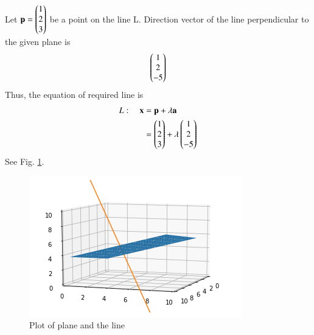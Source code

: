 
Let $\mathbf{p} = \begin{pmatrix}1\\2\\3\end{pmatrix}$ be a point on the line L.
Direction vector of the  line perpendicular to the given plane is
\begin{align}
 \begin{pmatrix}1\\2\\-5\end{pmatrix}
\end{align}
Thus, the equation of required line is
\begin{align}
    L: \quad \mathbf{x}&=\mathbf{p}+\lambda\mathbf{a}\\ &=\begin{pmatrix}1\\2\\3\end{pmatrix}+\lambda\begin{pmatrix}1\\2\\-5\end{pmatrix}
\end{align}
See Fig.  \ref{aug/2/34/plot}.
\begin{figure}[!h]
 \centering
 \includegraphics[width=\columnwidth]{solutions/aug/2/34/figs/Assignment4.png}
 \caption{Plot of plane and the line}
 \label{aug/2/34/plot}
\end{figure}


